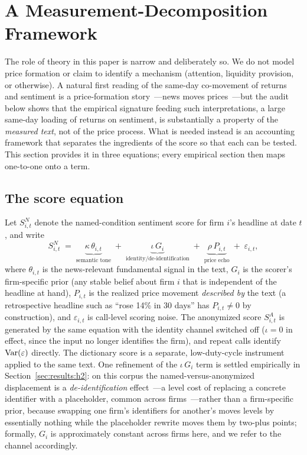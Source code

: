 \section{A Measurement-Decomposition Framework}\label{sec:framework}

The role of theory in this paper is narrow and deliberately so. We do not model price formation or claim to identify a mechanism (attention, liquidity provision, or otherwise). A natural first reading of the same-day co-movement of returns and sentiment is a price-formation story~---news moves prices~---but the audit below shows that the empirical signature feeding such interpretations, a large same-day loading of returns on sentiment, is substantially a property of the \emph{measured text}, not of the price process. What is needed instead is an accounting framework that separates the ingredients of the score so that each can be tested. This section provides it in three equations; every empirical section then maps one-to-one onto a term.

\subsection{The score equation}

Let $S^{N}_{i,t}$ denote the named-condition sentiment score for firm $i$'s headline at date $t$, and write
\begin{equation}\label{eq:score}
S^{N}_{i,t} \;=\; \underbrace{\kappa\,\theta_{i,t}}_{\text{semantic tone}}
\;+\; \underbrace{\iota\,G_i}_{\text{identity/de-identification}}
\;+\; \underbrace{\rho\,P_{i,t}}_{\text{price echo}}
\;+\; \varepsilon_{i,t},
\end{equation}
where $\theta_{i,t}$ is the news-relevant fundamental signal in the text, $G_i$ is the scorer's firm-specific prior (any stable belief about firm $i$ that is independent of the headline at hand), $P_{i,t}$ is the realized price movement \emph{described by} the text (a retrospective headline such as ``rose 14\% in 30 days'' has $P_{i,t}\neq 0$ by construction), and $\varepsilon_{i,t}$ is call-level scoring noise. The anonymized score $S^{A}_{i,t}$ is generated by the same equation with the identity channel switched off ($\iota=0$ in effect, since the input no longer identifies the firm), and repeat calls identify $\mathrm{Var}(\varepsilon)$ directly. The dictionary score is a separate, low-duty-cycle instrument applied to the same text. One refinement of the $\iota\,G_i$ term is settled empirically in Section~\ref{sec:results:h2}: on this corpus the named-versus-anonymized displacement is a \emph{de-identification} effect~---a level cost of replacing a concrete identifier with a placeholder, common across firms~---rather than a firm-specific prior, because swapping one firm's identifiers for another's moves levels by essentially nothing while the placeholder rewrite moves them by two-plus points; formally, $G_i$ is approximately constant across firms here, and we refer to the channel accordingly.

